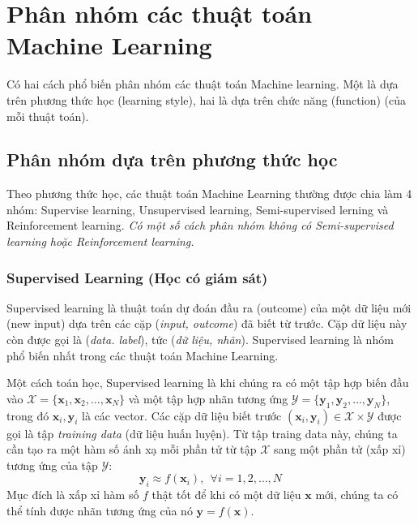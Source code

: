 
\chapter{Phân nhóm các thuật toán Machine Learning}

Có hai cách phổ biến phân nhóm các thuật toán Machine learning. Một là dựa trên phương thức học (learning style), hai là dựa trên chức năng (function) (của mỗi thuật toán). 
 
 
\section{Phân nhóm dựa trên phương thức học}
 
Theo phương thức học, các thuật toán Machine Learning thường được chia làm 4 nhóm: Supervise learning, Unsupervised learning, Semi-supervised lerning và Reinforcement learning. \textit{Có một số cách phân nhóm không có Semi-supervised learning hoặc Reinforcement learning.} 
 
\subsection{Supervised Learning (Học có giám sát) }
Supervised learning là thuật toán dự đoán đầu ra (outcome) của một dữ liệu mới (new input) dựa trên các cặp (\textit{input, outcome}) đã biết từ trước. Cặp dữ liệu này còn được gọi là (\textit{data. label}), tức (\textit{dữ liệu, nhãn}). Supervised learning là nhóm phổ biến nhất trong các thuật toán Machine Learning.  
 
Một cách toán học, Supervised learning là khi chúng ra có một tập hợp biến đầu vào $ \mathcal{X} = \{\mathbf{x}_1, \mathbf{x}_2, \dots, \mathbf{x}_N\} $ và một tập hợp nhãn tương ứng $ \mathcal{Y} = \{\mathbf{y}_1, \mathbf{y}_2, \dots, \mathbf{y}_N\} $, trong đó $ \mathbf{x}_i, \mathbf{y}_i $ là các vector.  
Các cặp dữ liệu biết trước $ (\mathbf{x}_i, \mathbf{y}_i) \in \mathcal{X} \times \mathcal{Y} $  
được gọi là tập \textit{training data} (dữ liệu huấn luyện). Từ tập traing data này, chúng ta cần tạo ra một hàm số ánh xạ mỗi phần tử từ tập $\mathcal{X}$ sang một phần tử (xấp xỉ) tương ứng của tập $\mathcal{Y}$: 
$$ \mathbf{y}_i \approx f(\mathbf{x}_i), ~~ \forall i = 1, 2, \dots, N$$  
Mục đích là xấp xỉ hàm số $f$ thật tốt để khi có một dữ liệu $\mathbf{x}$ mới, chúng ta có thể tính được nhãn tương ứng của nó $ \mathbf{y} = f(\mathbf{x}) $. 
     
